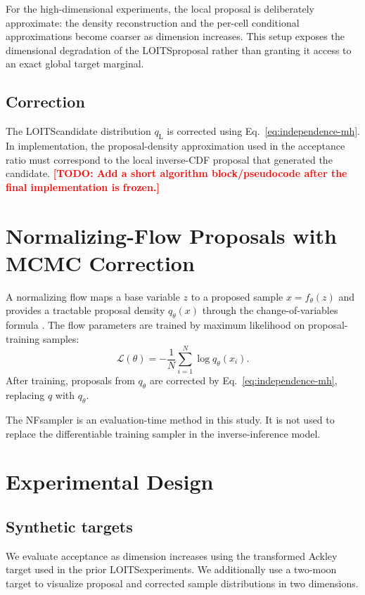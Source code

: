 \documentclass[11pt]{article}
\newcommand{\todo}[1]{\textcolor{red}{\textbf{[TODO: #1]}}}
\newcommand{\methodloits}{\textsc{LOITS}}
\newcommand{\methodnf}{\textsc{NF}}
\begin{document}
For the high-dimensional experiments, the local proposal is deliberately approximate: the density reconstruction and the per-cell conditional approximations become coarser as dimension increases. This setup exposes the dimensional degradation of the \methodloits proposal rather than granting it access to an exact global target marginal.

\subsection{Correction}
The \methodloits candidate distribution $q_{\mathrm{L}}$ is corrected using Eq.~\eqref{eq:independence-mh}. In implementation, the proposal-density approximation used in the acceptance ratio must correspond to the local inverse-CDF proposal that generated the candidate. \todo{Add a short algorithm block/pseudocode after the final implementation is frozen.}

\section{Normalizing-Flow Proposals with MCMC Correction}
\label{sec:nf}
A normalizing flow maps a base variable $z$ to a proposed sample $x=f_\theta(z)$ and provides a tractable proposal density $q_\theta(x)$ through the change-of-variables formula \citep{dinh2017}. The flow parameters are trained by maximum likelihood on proposal-training samples:
\begin{equation}
  \mathcal{L}(\theta) = -\frac{1}{N}\sum_{i=1}^{N}\log q_\theta(x_i).
  \label{eq:nf-loss}
\end{equation}
After training, proposals from $q_\theta$ are corrected by Eq.~\eqref{eq:independence-mh}, replacing $q$ with $q_\theta$.

The \methodnf sampler is an evaluation-time method in this study. It is not used to replace the differentiable training sampler in the inverse-inference model.

\section{Experimental Design}
\label{sec:experiments}
\subsection{Synthetic targets}
We evaluate acceptance as dimension increases using the transformed Ackley target used in the prior \methodloits experiments. We additionally use a two-moon target to visualize proposal and corrected sample distributions in two dimensions.
\end{document}
